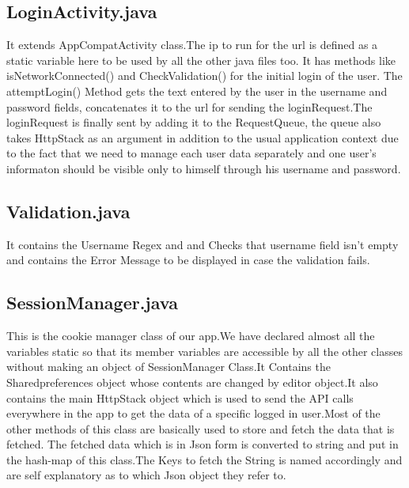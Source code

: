 \documentclass[a4paper,man,natbib]{apa6}
\begin{document}
\subsection{LoginActivity.java}

It extends AppCompatActivity class.The ip to run for the url is defined as a static variable here to be used by all the other java files too. It has methods like isNetworkConnected() and CheckValidation() for the initial login of the user. The attemptLogin() Method gets the text entered by the user in the username and password fields, concatenates it to the url for sending the loginRequest.The loginRequest is finally sent by adding it to the RequestQueue, the queue also takes HttpStack as an argument in addition to the usual application context due to the fact that we need to manage each user data separately and one user’s informaton should be visible only to himself through his username and password.
\subsection{Validation.java}

It contains the Username Regex and and Checks that username field isn’t empty and contains the Error Message to be displayed in case the validation fails.

\subsection{SessionManager.java}

This is the cookie manager class of our app.We have declared almost all the variables static so that its member variables are accessible by all the other classes without making an object of SessionManager Class.It Contains the Sharedpreferences object whose contents are changed by editor object.It also contains the main HttpStack object which is used to send the API calls everywhere in the app to get the data of a specific logged in user.Most of the other methods of this class are basically used to store and fetch the data that is fetched. The fetched data which is in Json form is converted to string and put in the hash-map of this class.The Keys to fetch the String is named accordingly and are self explanatory as to which Json object they refer to.
\end{document}
